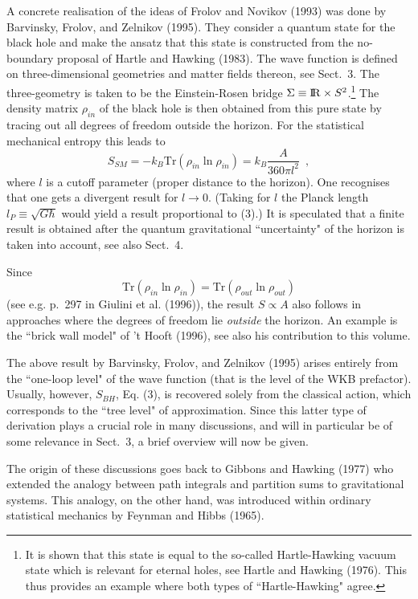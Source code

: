 \documentclass[12pt]{article}
\def\bbbr{{\rm I\!R}} %
\newcommand{\be}{\begin{equation}}
\newcommand{\ee}{\end{equation}}
\begin{document}
A concrete realisation of the ideas of Frolov and Novikov (1993)
was done by Barvinsky, Frolov, and Zelnikov (1995).
They consider a quantum state for the black hole and make the ansatz
that this state is constructed from the no-boundary proposal
of Hartle and Hawking (1983). The wave function is defined
on three-dimensional geometries and matter fields thereon, see
Sect.~3. The three-geometry is taken to be the Einstein-Rosen
bridge $\Sigma\equiv\bbbr\times S^2$.\footnote{It
 is shown that this state
is equal to the so-called Hartle-Hawking vacuum state which is
relevant for eternal holes, see Hartle and Hawking (1976). 
This thus provides an example where both types of ``Hartle-Hawking"
agree.} The density matrix $\rho_{in}$ of the black hole is then
obtained from this pure state by tracing out all degrees of freedom
outside the horizon. For the statistical mechanical entropy
this leads to
\be S_{SM}=-k_B\mbox{Tr}\left(\rho_{in}\ln\rho_{in}\right)=
     k_B\frac{A}{360\pi l^2} \enspace , \ee
where $l$ is a cutoff parameter (proper distance to the horizon).
One recognises that one gets a divergent result for $l\to 0$.
(Taking for $l$ the Planck length $l_P\equiv\sqrt{G\hbar}$
would yield a result proportional to (3).)
It is speculated that a finite result is obtained after the
quantum gravitational ``uncertainty" of the horizon is taken
into account, see also Sect.~4.

Since 
\[ \mbox{Tr}\left(\rho_{in}\ln\rho_{in}\right)=
    \mbox{Tr}\left(\rho_{out}\ln\rho_{out}\right) \]
(see e.g. p.~297 in Giulini et al. (1996)), the result $S\propto A$
also follows in approaches where the degrees of freedom
lie {\em outside} the horizon. An example is the ``brick wall model"
of 't Hooft (1996), see also his contribution to this volume.

The above result by Barvinsky, Frolov, and Zelnikov (1995)
arises entirely from the ``one-loop level" of the wave function
(that is the level of the WKB prefactor). Usually, however, 
$S_{BH}$, Eq. (3), is recovered solely from the classical
action, which corresponds to the ``tree level" of approximation.
Since this latter type of derivation plays a crucial role in many
discussions, and will in particular be of some relevance in
Sect.~3, a brief overview will now be given.

The origin of these discussions goes back to Gibbons and Hawking
(1977) who extended the analogy between path integrals and
partition sums to gravitational systems. This analogy, on the
other hand, was introduced within ordinary statistical mechanics
by Feynman and Hibbs (1965). 
\end{document}
